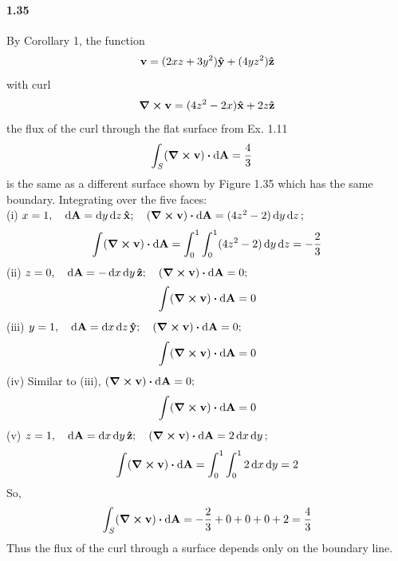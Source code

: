\documentclass[../main.tex]{subfiles}
\begin{document}
\paragraph{1.35}
By Corollary 1, the function
\begin{align*}
    \vb{v} = (2xz + 3y^2) \vu{y} + (4yz^2) \vu{z}
\end{align*}
with curl
\begin{align*}
    \curl{\vb{v}} = (4z^2 - 2x) \vu{x} + 2z \vu{z}
\end{align*}
the flux of the curl through the flat surface from Ex. 1.11
\begin{align*}
    \int_S (\curl{\vb{v}}) \vdot \dd{\vb{A}} &= \frac{4}{3}
\end{align*}
is the same as a different surface shown by Figure 1.35 which has the same boundary. Integrating
over the five faces: \\
(i) $x=1, \quad \dd{\vb{A}} = \dd{y}\dd{z} \vu{x};
\quad (\curl{\vb{v}}) \vdot \dd{\vb{A}} = (4z^2 - 2) \dd{y}\dd{z};$
\begin{align*}
    \int (\curl{\vb{v}}) \vdot \dd{\vb{A}}
        = \int_0^1 \int_0^1 (4z^2 - 2) \dd{y}\dd{z} = -\frac{2}{3}
\end{align*}
(ii) $z = 0, \quad \dd{\vb{A}} = -\dd{x}\dd{y} \vu{z};
\quad (\curl{\vb{v}}) \vdot \dd{\vb{A}} = 0;$
\begin{align*}
    \int (\curl{\vb{v}}) \vdot \dd{\vb{A}} = 0
\end{align*}
(iii) $y = 1, \quad \dd{\vb{A}} = \dd{x}\dd{z} \vu{y};
\quad (\curl{\vb{v}}) \vdot \dd{\vb{A}} = 0;$
\begin{align*}
    \int (\curl{\vb{v}}) \vdot \dd{\vb{A}} = 0
\end{align*}
(iv) Similar to (iii), $(\curl{\vb{v}}) \vdot \dd{\vb{A}} = 0;$
\begin{align*}
    \int (\curl{\vb{v}}) \vdot \dd{\vb{A}} = 0
\end{align*}
(v) $z = 1, \quad \dd{\vb{A}} = \dd{x}\dd{y} \vu{z};
\quad (\curl{\vb{v}}) \vdot \dd{\vb{A}} = 2 \dd{x}\dd{y};$
\begin{align*}
    \int (\curl{\vb{v}}) \vdot \dd{\vb{A}} = \int_0^1 \int_0^1 2 \dd{x}\dd{y} = 2
\end{align*}
So,
\begin{align*}
    \int_S (\curl{\vb{v}}) \vdot \dd{\vb{A}} = -\frac{2}{3} + 0 + 0 + 0 + 2 = \frac{4}{3}
\end{align*}
Thus the flux of the curl through a surface depends only on the boundary line.
\end{document}
